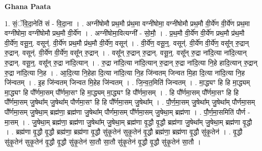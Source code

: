 \documentclass[17pt]{extarticle}
\begin{document}
\textbf{Ghana Paata } \newline

1. सं॒ॅवि॒दा॒नेति॑ सं - वि॒दा॒ना । . अग्नी॑षोमौ प्रथ॒मौ प्र॑थ॒मा वग्नी॑षोमा॒ वग्नी॑षोमौ प्रथ॒मौ वी॒र्ये॑ण वी॒र्ये॑ण प्रथ॒मा वग्नी॑षोमा॒ वग्नी॑षोमौ प्रथ॒मौ वी॒र्ये॑ण । . अग्नी॑षोमा॒वित्यग्नी᳚ - सो॒मौ॒ । . प्र॒थ॒मौ वी॒र्ये॑ण वी॒र्ये॑ण प्रथ॒मौ प्र॑थ॒मौ वी॒र्ये॑ण॒ वसू॒न्॒. वसून्॑. वी॒र्ये॑ण प्रथ॒मौ प्र॑थ॒मौ वी॒र्ये॑ण॒ वसून्॑ । . वी॒र्ये॑ण॒ वसू॒न्॒. वसून्॑. वी॒र्ये॑ण वी॒र्ये॑ण॒ वसू᳚न् रु॒द्रान् रु॒द्रान्. वसून्॑. वी॒र्ये॑ण वी॒र्ये॑ण॒ वसू᳚न् रु॒द्रान् । . वसू᳚न् रु॒द्रान् रु॒द्रान्. वसू॒न्॒. वसू᳚न् रु॒द्रा ना॑दि॒त्या ना॑दि॒त्यान् रु॒द्रान्. वसू॒न्॒. वसू᳚न् रु॒द्रा ना॑दि॒त्यान् । . रु॒द्रा ना॑दि॒त्या ना॑दि॒त्यान् रु॒द्रान् रु॒द्रा ना॑दि॒त्या नि॒हे हादि॒त्यान् रु॒द्रान् रु॒द्रा ना॑दि॒त्या नि॒ह । . आ॒दि॒त्या नि॒हेहा दि॒त्या ना॑दि॒त्या नि॒ह जि॑न्वतम् जिन्वत मि॒हा दि॒त्या ना॑दि॒त्या नि॒ह जि॑न्वतम् । . इ॒ह जि॑न्वतम् जिन्वत मि॒हेह जि॑न्वतम् । . जि॒न्व॒त॒मिति॑ जिन्वतम् । . मा॒द्ध्यꣳ हि हि मा॒द्ध्यम् मा॒द्ध्यꣳ हि पौ᳚र्णमा॒सम् पौ᳚र्णमा॒सꣳ हि मा॒द्ध्यम् मा॒द्ध्यꣳ हि 
पौ᳚र्णमा॒सम् । . हि पौ᳚र्णमा॒सम् पौ᳚र्णमा॒सꣳ हि हि पौ᳚र्णमा॒सम् जु॒षेथा᳚म् जु॒षेथा᳚म् पौर्णमा॒सꣳ हि हि 
पौ᳚र्णमा॒सम् जु॒षेथा᳚म् । . पौ॒र्ण॒मा॒सम् जु॒षेथा᳚म् जु॒षेथा᳚म् पौर्णमा॒सम् पौ᳚र्णमा॒सम् जु॒षेथा॒म् ब्रह्म॑णा॒ ब्रह्म॑णा जु॒षेथा᳚म् पौर्णमा॒सम् पौ᳚र्णमा॒सम् जु॒षेथा॒म् ब्रह्म॑णा । . पौ॒र्ण॒मा॒समिति॑ पौर्ण - मा॒सम् । . जु॒षेथा॒म् ब्रह्म॑णा॒ ब्रह्म॑णा जु॒षेथा᳚म् जु॒षेथा॒म् ब्रह्म॑णा वृ॒द्धौ वृ॒द्धौ ब्रह्म॑णा जु॒षेथा᳚म् जु॒षेथा॒म् ब्रह्म॑णा वृ॒द्धौ । . ब्रह्म॑णा वृ॒द्धौ वृ॒द्धौ ब्रह्म॑णा॒ ब्रह्म॑णा वृ॒द्धौ सु॑कृ॒तेन॑ सुकृ॒तेन॑ वृ॒द्धौ ब्रह्म॑णा॒ ब्रह्म॑णा वृ॒द्धौ सु॑कृ॒तेन॑ । . वृ॒द्धौ सु॑कृ॒तेन॑ सुकृ॒तेन॑ वृ॒द्धौ वृ॒द्धौ सु॑कृ॒तेन॑ सा॒तौ सा॒तौ सु॑कृ॒तेन॑ वृ॒द्धौ वृ॒द्धौ सु॑कृ॒तेन॑ सा॒तौ । \newline
\end{document}
